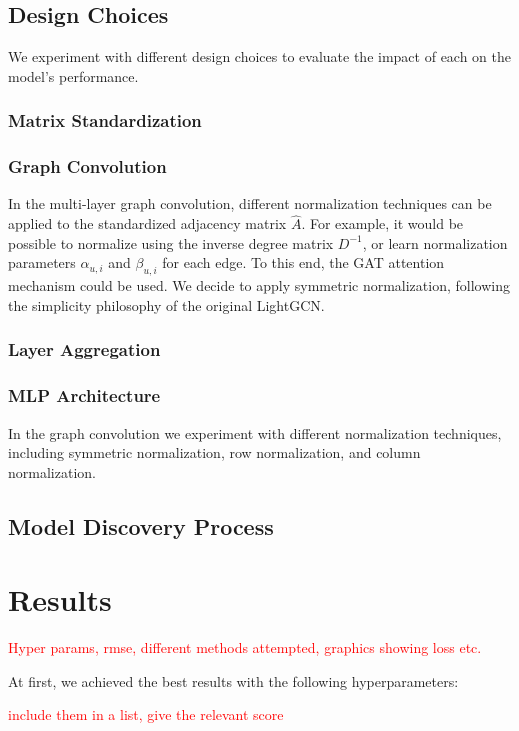 \documentclass[10pt,conference,compsocconf]{IEEEtran}
\begin{document}
\subsection{Design Choices}
We experiment with different design choices to evaluate the impact of each on the model's performance.
\subsubsection{Matrix Standardization}
\subsubsection{Graph Convolution}
In the multi-layer graph convolution, different normalization techniques can be applied to the standardized adjacency matrix $\hat{A}$.
For example, it would be possible to normalize using the inverse degree matrix $D^{-1}$, or learn normalization parameters $\alpha_{u,i}$ and $\beta_{u,i}$ for each edge.
To this end, the GAT \cite{velivckovic2018graph} attention mechanism could be used. 
We decide to apply symmetric normalization, following the simplicity philosophy of the original LightGCN.
\subsubsection{Layer Aggregation}
\subsubsection{MLP Architecture}
In the graph convolution we experiment with different normalization techniques, including symmetric normalization, row normalization, and column normalization.

\subsection{Model Discovery Process}

\section{Results}
\label{sec:tips-writing}

\textcolor{red}{Hyper params, rmse, different methods attempted, graphics showing loss etc.}

At first, we achieved the best results with the following hyperparameters:

\textcolor{red}{include them in a list, give the relevant score}
\end{document}
